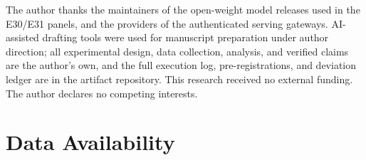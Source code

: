 \documentclass[acmsmall]{acmart}
\theoremstyle{acmdefinition}
\begin{document}














\begin{acks}
The author thanks the maintainers of the open-weight model releases used
in the E30/E31 panels, and the providers of the authenticated serving
gateways. AI-assisted
drafting tools were used for manuscript preparation under author direction;
all experimental design, data collection, analysis, and verified claims are
the author's own, and the full execution log, pre-registrations, and deviation
ledger are in the artifact repository. This research received no external
funding. The author declares no competing interests.
\end{acks}

\section*{Data Availability}
\end{document}
